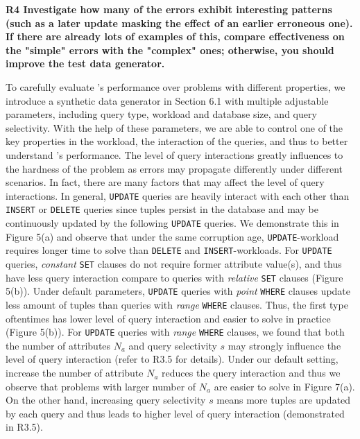 \noindent \textbf{R4 Investigate how many of the errors exhibit interesting patterns (such as a later update masking the effect of an earlier erroneous one). If there are already lots of examples of this, compare effectiveness on the "simple" errors with the "complex" ones; otherwise, you should improve the test data generator.}

To carefully evaluate \sys's performance over problems with different properties, we introduce a synthetic data generator in Section 6.1 with multiple adjustable parameters, including query type, workload and database size, and query selectivity. 
With the help of these parameters, we are able to control one of the key properties in the workload, the interaction of the queries, 
and thus to better understand \sys's performance. The level of query interactions greatly influences to the hardness of the problem as errors may propagate differently under different scenarios. In fact, there are many factors that may affect the level of query interactions. In general, \texttt{UPDATE} queries are heavily interact with each other than \texttt{INSERT} or \texttt{DELETE} queries since tuples persist in the database and may be continuously updated by the following \texttt{UPDATE} queries. We demonstrate this in Figure 5(a) and observe that under the same corruption age, \texttt{UPDATE}-workload requires longer time to solve than \texttt{DELETE} and \texttt{INSERT}-workloads. For \texttt{UPDATE} queries, \textit{constant} \texttt{SET} clauses do not require former attribute value(s), and thus have less query interaction compare to queries with \textit{relative} \texttt{SET} clauses (Figure 5(b)). Under default parameters, \texttt{UPDATE} queries with \textit{point} \texttt{WHERE} clauses update less amount of tuples than queries with \textit{range} \texttt{WHERE} clauses. Thus, the first type oftentimes has lower level of query interaction and easier to solve in practice (Figure 5(b)). For \texttt{UPDATE} queries with \textit{range} \texttt{WHERE} clauses, we found that both the number of attributes $N_a$ and query selectivity $s$ may strongly influence the level of query interaction (refer to R3.5 for details). Under our default setting, increase the number of attribute $N_a$ reduces the query interaction and thus we observe that problems with larger number of $N_a$ are easier to solve in Figure 7(a). On the other hand, increasing query selectivity $s$ means more tuples are updated by each query and thus leads to higher level of query interaction (demonstrated in R3.5).


